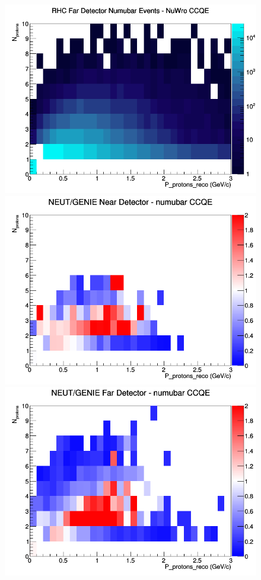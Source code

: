 \documentclass[12pt]{article}
\begin{document}
\begin{figure}[h]
\endminipage
{}
\includegraphics[width=\linewidth]{eff_N_P/FGT/protons/CCQE_RHC_FD_numubar_N_P_NuWro.png}
\endminipage
\newline
{}
\includegraphics[width=\linewidth]{eff_N_P/FGT/protons/ratios/CCQE_NEUT_GENIE_numubar_near_N_P.png}
\endminipage
{}
\includegraphics[width=\linewidth]{eff_N_P/FGT/protons/ratios/CCQE_NEUT_GENIE_numubar_far_N_P.png}

\end{figure}
\end{document}
